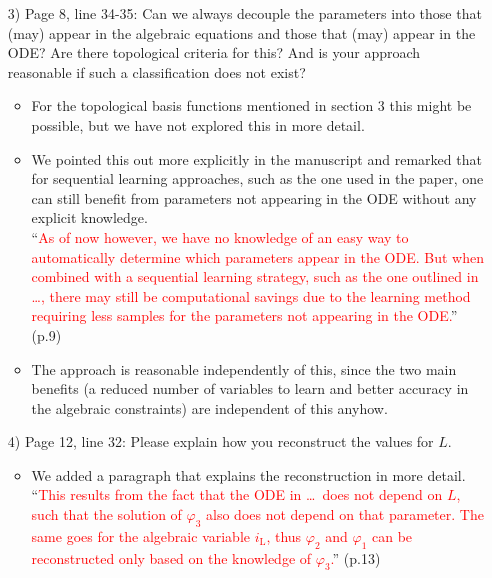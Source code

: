 \documentclass[a4paper, 10pt,
    ]{article}
\newcommand{\mr}[1]{\mathrm{#1}}
\begin{document}
\begin{itemize}
        \item[3)] \textcolor{TUDa-0c}{Page 8, line 34-35: Can we always decouple the parameters into those that (may) appear in the algebraic equations and those that (may) appear in the ODE? Are there topological criteria for this? And is your approach reasonable if such a classification does not exist?}
        \begin{itemize}
            \item For the topological basis functions mentioned in section 3 this might be possible, but we have not explored this in more detail.
            \item We pointed this out more explicitly in the manuscript and remarked that for sequential learning approaches, such as the one used in the paper, one can still benefit from parameters not appearing in the ODE without any explicit knowledge.\\
            ``\textcolor{red}{As of now however, we have no knowledge of an easy way to automatically determine which parameters appear in the ODE. But when combined with a sequential learning strategy, such as the one outlined in \dots, there may still be computational savings due to the learning method requiring less samples for the parameters not appearing in the ODE.}'' (p.9)
            \item The approach is reasonable independently of this, since the two main benefits (a reduced number of variables to learn and better accuracy in the algebraic constraints) are independent of this anyhow.
        \end{itemize}

        \item[4)] \textcolor{TUDa-0c}{Page 12, line 32: Please explain how you reconstruct the values for $L$.}
        \begin{itemize}
            \item We added a paragraph that explains the reconstruction in more detail.\\
            ``\textcolor{red}{This results from the fact that the ODE in \dots\ does not depend on $L$, such that the solution of $\varphi_3$ also does not depend on that parameter. The same goes for the algebraic variable $i_\mr{L}$, thus $\varphi_2$ and $\varphi_1$ can be reconstructed only based on the knowledge of $\varphi_3$.}'' (p.13)
        \end{itemize}


\end{itemize}
\end{document}
